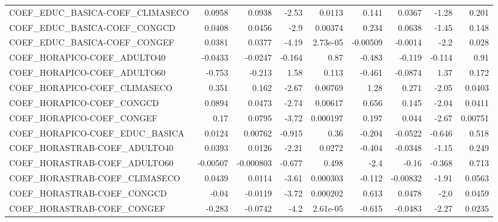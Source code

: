 \begin{tabular}{lrrrrrrrr}
COEF\_EDUC\_BASICA-COEF\_CLIMASECO       &      0.0958 &       0.0938 &    -2.53 &   0.0113 &      0.141 &      0.0367 &        -1.28 &         0.201 \\
COEF\_EDUC\_BASICA-COEF\_CONGCD          &      0.0408 &       0.0456 &     -2.9 &  0.00374 &      0.234 &      0.0638 &        -1.45 &         0.148 \\
COEF\_EDUC\_BASICA-COEF\_CONGEF          &      0.0381 &       0.0377 &    -4.19 & 2.73e-05 &   -0.00509 &     -0.0014 &         -2.2 &         0.028 \\
COEF\_HORAPICO-COEF\_ADULTO40           &     -0.0433 &      -0.0247 &   -0.164 &     0.87 &     -0.483 &      -0.119 &       -0.114 &          0.91 \\
COEF\_HORAPICO-COEF\_ADULTO60           &      -0.753 &       -0.213 &     1.58 &    0.113 &     -0.461 &     -0.0874 &         1.37 &         0.172 \\
COEF\_HORAPICO-COEF\_CLIMASECO          &       0.351 &        0.162 &    -2.67 &  0.00769 &       1.28 &       0.271 &        -2.05 &        0.0403 \\
COEF\_HORAPICO-COEF\_CONGCD             &      0.0894 &       0.0473 &    -2.74 &  0.00617 &      0.656 &       0.145 &        -2.04 &        0.0411 \\
COEF\_HORAPICO-COEF\_CONGEF             &        0.17 &       0.0795 &    -3.72 & 0.000197 &      0.197 &       0.044 &        -2.67 &       0.00751 \\
COEF\_HORAPICO-COEF\_EDUC\_BASICA        &      0.0124 &      0.00762 &   -0.915 &     0.36 &     -0.204 &     -0.0522 &       -0.646 &         0.518 \\
COEF\_HORASTRAB-COEF\_ADULTO40          &      0.0393 &       0.0126 &    -2.21 &   0.0272 &     -0.404 &     -0.0348 &        -1.15 &         0.249 \\
COEF\_HORASTRAB-COEF\_ADULTO60          &    -0.00507 &    -0.000803 &   -0.677 &    0.498 &       -2.4 &       -0.16 &       -0.368 &         0.713 \\
COEF\_HORASTRAB-COEF\_CLIMASECO         &      0.0439 &       0.0114 &    -3.61 & 0.000303 &     -0.112 &    -0.00832 &        -1.91 &        0.0563 \\
COEF\_HORASTRAB-COEF\_CONGCD            &       -0.04 &      -0.0119 &    -3.72 & 0.000202 &      0.613 &      0.0478 &         -2.0 &        0.0459 \\
COEF\_HORASTRAB-COEF\_CONGEF            &      -0.283 &      -0.0742 &     -4.2 & 2.61e-05 &     -0.615 &     -0.0483 &        -2.27 &        0.0235 \\

\end{tabular}
